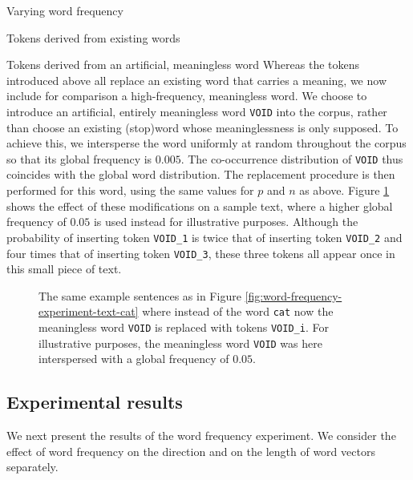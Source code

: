 \documentclass{article} %
\newcommand{\word}[1]{\texttt{#1}}
\begin{document}
\begin{section}{Varying word frequency}
\begin{subsection}{Tokens derived from existing words}
\end{subsection}

\begin{subsection}{Tokens derived from an artificial, meaningless word}\label{WFVEmeaningless}
Whereas the tokens introduced above all replace an existing word that
carries a meaning, we now include for comparison a high-frequency,
meaningless word.  We choose to introduce an artificial, entirely
meaningless word \word{VOID} into the corpus, rather than choose an
existing (stop)word whose meaninglessness is only supposed.  To achieve
this, we intersperse the word uniformly at random throughout the corpus so
that its global frequency is $0.005$.  The co-occurrence
distribution of \word{VOID} thus coincides with the global word
distribution.  The replacement procedure is then performed for this
word, using the same values for $p$ and $n$ as above.
Figure \ref{fig:word-frequency-experiment-text-void} shows the effect of
these modifications on a sample text, where a higher global frequency of $0.05$ is used instead
for illustrative purposes.  Although the probability of inserting token
\word{VOID\_1} is twice that of inserting token \word{VOID\_2} and four
times that of inserting token \word{VOID\_3}, these three tokens all
appear once in this small piece of text.

\begin{figure}
	\begin{mdframed}
	
	\end{mdframed}
	\caption{The same example sentences as in
          Figure \ref{fig:word-frequency-experiment-text-cat} where
          instead of the word \word{cat} now the meaningless word
          \word{VOID} is replaced with tokens \word{VOID\_i}.  For
          illustrative purposes, the meaningless word \word{VOID} was
          here interspersed with a global frequency of $0.05$.}
	\label{fig:word-frequency-experiment-text-void}
\end{figure}
\end{subsection}

\subsection{Experimental results}\label{WFVE-results}
We next present the results of the word frequency experiment. We
consider the effect of word frequency on the direction and on the length
of word vectors separately.


\end{section}
\end{document}
